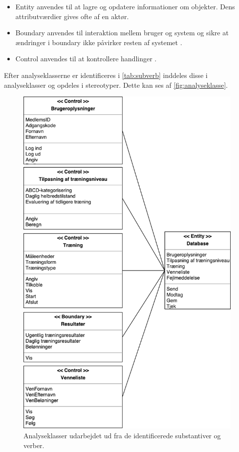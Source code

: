 \begin{itemize}
\item Entity anvendes til at lagre og opdatere informationer om objekter. Dens attributværdier gives ofte af en aktør.\cite{RSC2002}
\item Boundary anvendes til interaktion mellem bruger og system og sikre at ændringer i boundary ikke påvirker resten af systemet \cite{RSC2002}.
\item Control anvendes til at kontrollere handlinger \cite{RSC2002}. 
\end{itemize}

Efter analyseklasserne er identificeres i  \autoref{tab:subverb} inddeles disse i analyseklasser og opdeles i stereotyper. Dette kan ses af \autoref{fig:analyseklasse}. 

\begin{figure}[H]
\centering
\includegraphics[width=1\textwidth]{figures/aktivitetsdiagram/analyseklasser}
\caption{Analyseklasser udarbejdet ud fra de identificerede substantiver og verber.}
\label{fig:analyseklasse}
\end{figure}

